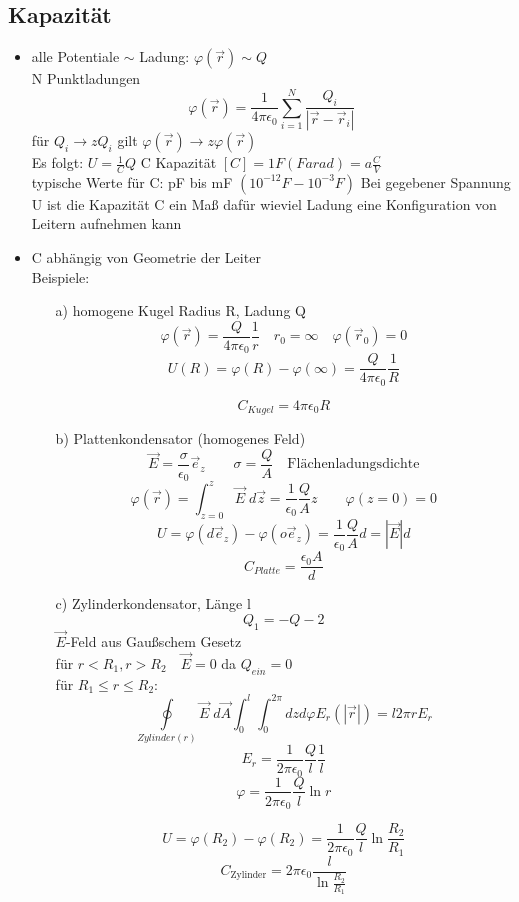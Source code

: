 \documentclass[titlepage,12pt,a4paper,ngerman]{report}
\newcommand{\tx}[1]{\textrm{#1}}
\begin{document}
\subsection{Kapazität}
\begin{itemize}
\item alle Potentiale $\sim$ Ladung: $\varphi(\vec{r}) \sim Q$\\
N Punktladungen $$\varphi(\vec{r}) = \frac{1}{4\pi\epsilon_0} \sum^N_{i=1} \frac{Q_i}{|\vec{r}-\vec{r}_i|}$$
für $Q_i \rightarrow z Q_i $ gilt $\varphi(\vec{r}) \rightarrow z \varphi(\vec{r})$\\
Es folgt: $ U = \frac{1}{C} Q$
C Kapazität $[C] = 1 F (Farad) = a \frac{C}{V}$\\
typische Werte für C: pF bis mF $(10^{-12}F - 10^{-3}F)$
Bei gegebener Spannung U ist die Kapazität C ein Maß dafür wieviel Ladung eine Konfiguration von Leitern aufnehmen kann
\item C abhängig von Geometrie der Leiter\\
Beispiele:
\begin{itemize}
\item[a)] homogene Kugel Radius R, Ladung Q
$$\varphi(\vec{r}) = \frac{Q}{4\pi\epsilon_0} \frac{1}{r} \quad r_0 = \infty \quad \varphi(\vec{r}_0) = 0$$
$$U(R) = \varphi(R) - \varphi(\infty) = \frac{Q}{4\pi\epsilon_0} \frac{1}{R}$$


$$ C_{Kugel} = 4\pi\epsilon_0 R$$
\item[b)] Plattenkondensator (homogenes Feld)
$$ \vec{E}= \frac{\sigma}{\epsilon_0} \vec{e}_z \qquad \sigma = \frac{Q}{A} \quad \textrm{Flächenladungsdichte}$$
$$\varphi(\vec{r}) = \int_{z=0}^{z} \vec{E} \; d\vec{z} = \frac{1}{\epsilon_0} \frac{Q}{A} z \qquad \varphi(z=0) = 0$$
$$U = \varphi(d\vec{e}_z) - \varphi(o \vec{e}_z) = \frac{1}{\epsilon_0} \frac{Q}{A} d = |\vec{E}| d$$
$$\boxed{C_{Platte} = \frac{\epsilon_0 A}{d}}$$
\item[c)] Zylinderkondensator, Länge l 
$$ Q_1 = - Q-2$$
$ \vec{E}$-Feld aus Gaußschem Gesetz\\
für $r<R_1 , r>R_2 \quad \vec{E}=0$ da $Q_{ein} = 0$\\
für $R_1 \le r \le R_2$: 
$$\oint\limits_{Zylinder(r)} \vec{E}\; d\vec{A} \int_0^l \int_0^{2\pi} dz d\varphi E_r (|\vec{r}|) = l 2\pi r E_r$$
$$E_r = \frac{1}{2\pi\epsilon_0} \frac{Q}{l} \frac{1}{l}$$
$$\varphi = \frac{1}{2\pi\epsilon_0} \frac{Q}{l} \ln{r}$$

$$ U = \varphi(R_2) - \varphi(R_2) = \frac{1}{2 \pi \epsilon_0} \frac{Q}{l} \ln \frac{R_2}{R_1}$$
$$C_{\tx{Zylinder}} = 2 \pi \epsilon_0 \frac{l}{\ln \frac{R_2}{R_1}}$$


\end{itemize}
\end{itemize}
\end{document}
